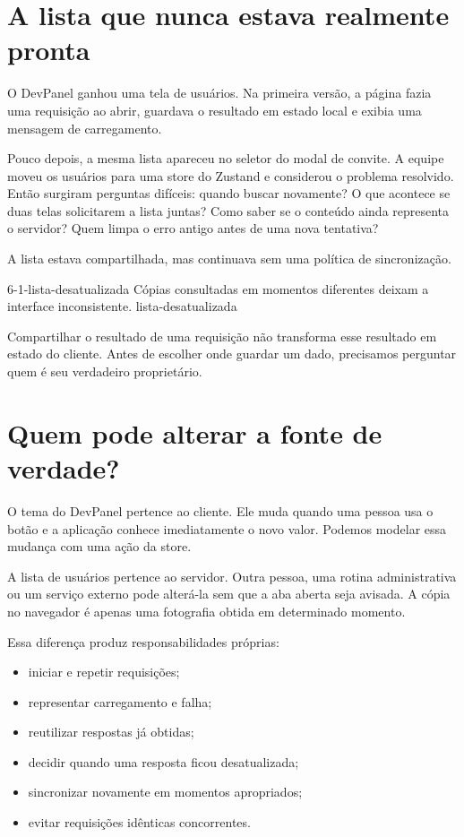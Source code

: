 \label{chap:estado-do-servidor}

\section{A lista que nunca estava realmente pronta}

\begin{historia}
O DevPanel ganhou uma tela de usuários. Na primeira versão, a página fazia uma
requisição ao abrir, guardava o resultado em estado local e exibia uma mensagem
de carregamento.

Pouco depois, a mesma lista apareceu no seletor do modal de convite. A equipe
moveu os usuários para uma store do Zustand e considerou o problema resolvido.
Então surgiram perguntas difíceis: quando buscar novamente? O que acontece se
duas telas solicitarem a lista juntas? Como saber se o conteúdo ainda representa
o servidor? Quem limpa o erro antigo antes de uma nova tentativa?

A lista estava compartilhada, mas continuava sem uma política de sincronização.
\end{historia}

\imagemcapitulo
  {6-1-lista-desatualizada}
  {Cópias consultadas em momentos diferentes deixam a interface inconsistente.}
  {lista-desatualizada}

Compartilhar o resultado de uma requisição não transforma esse resultado em
estado do cliente. Antes de escolher onde guardar um dado, precisamos perguntar
quem é seu verdadeiro proprietário.

\section{Quem pode alterar a fonte de verdade?}

O tema do DevPanel pertence ao cliente. Ele muda quando uma pessoa usa o botão e
a aplicação conhece imediatamente o novo valor. Podemos modelar essa mudança com
uma ação da store.

A lista de usuários pertence ao servidor. Outra pessoa, uma rotina administrativa
ou um serviço externo pode alterá-la sem que a aba aberta seja avisada. A cópia
no navegador é apenas uma fotografia obtida em determinado momento.

Essa diferença produz responsabilidades próprias:

\begin{itemize}
  \item iniciar e repetir requisições;
  \item representar carregamento e falha;
  \item reutilizar respostas já obtidas;
  \item decidir quando uma resposta ficou desatualizada;
  \item sincronizar novamente em momentos apropriados;
  \item evitar requisições idênticas concorrentes.
\end{itemize}

